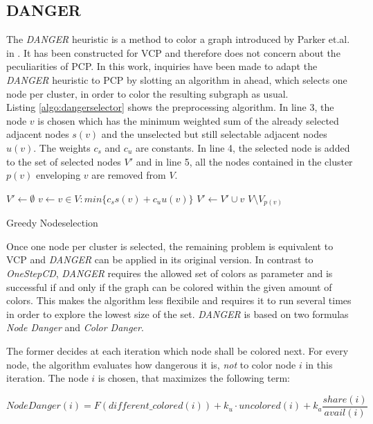 \subsection{DANGER}

The \textit{DANGER} heuristic is a method to color a graph introduced by Parker et.al. in \cite{glover-96}. It has been constructed for VCP and therefore does not concern about the peculiarities of PCP. In this work, inquiries have been made to adapt the \textit{DANGER} heuristic to PCP by slotting an algorithm in ahead, which selects one node per cluster, in order to color the resulting subgraph as usual.\\ 
Listing \ref{algo:dangerselector} shows the preprocessing algorithm. In line 3, the node $v$ is chosen which has the minimum weighted sum of the already selected adjacent nodes $s(v)$ and the unselected but still selectable adjacent nodes $u(v)$. The weights $c_s$ and $c_u$ are constants. In line 4, the selected node is added to the set of selected nodes $V'$ and in line 5, all the nodes contained in the cluster $p(v)$ enveloping $v$ are removed from $V$. 

\begin{algorithm}[h]
$V' \gets \emptyset$\;
 {
	$v \gets v\in V : min\{ c_s s(v) + c_u u(v) \}$\;
	$V' \gets V' \cup v$\;
	$V \setminus V_{p(v)}$\;
}
\caption{Greedy Nodeselection}
\label{algo:dangerselector}
\end{algorithm}

Once one node per cluster is selected, the remaining problem is equivalent to VCP and \textit{DANGER} can be applied in its original version. In contrast to \textit{OneStepCD}, \textit{DANGER} requires the allowed set of colors as parameter and is successful if and only if the graph can be colored within the given amount of colors. This makes the algorithm less flexibile and requires it to run several times in order to explore the lowest size of the set. \textit{DANGER} is based on two formulas \textit{Node Danger} and \textit{Color Danger}.

The former decides at each iteration which node shall be colored next. For every node, the algorithm evaluates how dangerous it is, \textit{not} to color node $i$ in this iteration. The node $i$ is chosen, that maximizes the following term:

$$ \mathit{NodeDanger}(i) =  F(\mathit{different\_colored}(i)) + k_u \cdot \mathit{uncolored}(i) + k_a \frac{\mathit{share}(i)}{\mathit{avail}(i)} $$

